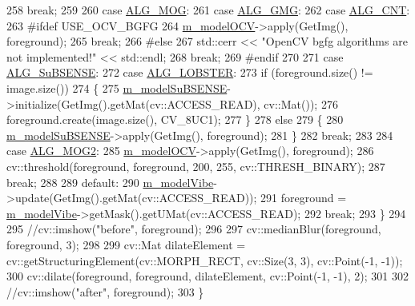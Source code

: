 \begin{DoxyCode}
258         \textcolor{keywordflow}{break};
259 
260     \textcolor{keywordflow}{case} \mbox{\hyperlink{class_background_subtract_a56850081696df68b55f87b4f3d87949fa6ce3f5db7dc79642df7c113be3a28d14}{ALG\_MOG}}:
261     \textcolor{keywordflow}{case} \mbox{\hyperlink{class_background_subtract_a56850081696df68b55f87b4f3d87949fa3d46f57cfb0a9b1b5b037b387a35f652}{ALG\_GMG}}:
262     \textcolor{keywordflow}{case} \mbox{\hyperlink{class_background_subtract_a56850081696df68b55f87b4f3d87949fa4e734ae21b8add9022427f8da9469cfb}{ALG\_CNT}}:
263 \textcolor{preprocessor}{#ifdef USE\_OCV\_BGFG}
264         \mbox{\hyperlink{class_background_subtract_a80782a38138a430437095f625603e599}{m\_modelOCV}}->apply(GetImg(), foreground);
265         \textcolor{keywordflow}{break};
266 \textcolor{preprocessor}{#else}
267         std::cerr << \textcolor{stringliteral}{"OpenCV bgfg algorithms are not implemented!"} << std::endl;
268         \textcolor{keywordflow}{break};
269 \textcolor{preprocessor}{#endif}
270 
271     \textcolor{keywordflow}{case} \mbox{\hyperlink{class_background_subtract_a56850081696df68b55f87b4f3d87949fa0a4e184ec94bca58e58dd4226f1b1f7f}{ALG\_SuBSENSE}}:
272     \textcolor{keywordflow}{case} \mbox{\hyperlink{class_background_subtract_a56850081696df68b55f87b4f3d87949fae4cc76d1ae01949bc7e6be6ed046ddaf}{ALG\_LOBSTER}}:
273         \textcolor{keywordflow}{if} (foreground.size() != image.size())
274         \{
275             \mbox{\hyperlink{class_background_subtract_a56275963c8cacca97b97d0cde884f4c1}{m\_modelSuBSENSE}}->initialize(GetImg().getMat(cv::ACCESS\_READ), cv::Mat());
276             foreground.create(image.size(), CV\_8UC1);
277         \}
278         \textcolor{keywordflow}{else}
279         \{
280             \mbox{\hyperlink{class_background_subtract_a56275963c8cacca97b97d0cde884f4c1}{m\_modelSuBSENSE}}->apply(GetImg(), foreground);
281         \}
282         \textcolor{keywordflow}{break};
283 
284     \textcolor{keywordflow}{case} \mbox{\hyperlink{class_background_subtract_a56850081696df68b55f87b4f3d87949fa35994e745da8eb824d3808ee50ad3ebf}{ALG\_MOG2}}:
285         \mbox{\hyperlink{class_background_subtract_a80782a38138a430437095f625603e599}{m\_modelOCV}}->apply(GetImg(), foreground);
286         cv::threshold(foreground, foreground, 200, 255, cv::THRESH\_BINARY);
287         \textcolor{keywordflow}{break};
288 
289     \textcolor{keywordflow}{default}:
290         \mbox{\hyperlink{class_background_subtract_a57c251abeed9a2c73a3c97d0f7f8b527}{m\_modelVibe}}->update(GetImg().getMat(cv::ACCESS\_READ));
291         foreground = \mbox{\hyperlink{class_background_subtract_a57c251abeed9a2c73a3c97d0f7f8b527}{m\_modelVibe}}->getMask().getUMat(cv::ACCESS\_READ);
292         \textcolor{keywordflow}{break};
293     \}
294 
295     \textcolor{comment}{//cv::imshow("before", foreground);}
296 
297     cv::medianBlur(foreground, foreground, 3);
298 
299     cv::Mat dilateElement = cv::getStructuringElement(cv::MORPH\_RECT, cv::Size(3, 3), cv::Point(-1, -1));
300     cv::dilate(foreground, foreground, dilateElement, cv::Point(-1, -1), 2);
301 
302     \textcolor{comment}{//cv::imshow("after", foreground);}
303 \}
\end{DoxyCode}


